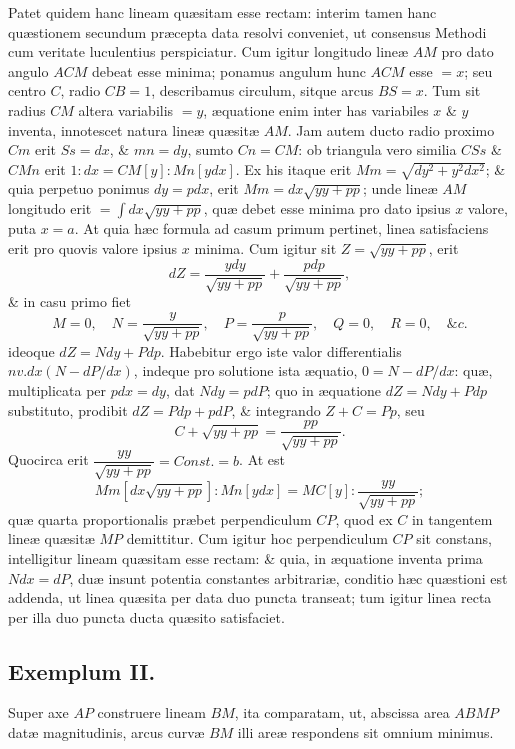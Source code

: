 Patet quidem hanc lineam quæsitam esse rectam: interim tamen hanc quæstionem secundum præcepta data resolvi conveniet, ut consensus Methodi cum veritate luculentius perspiciatur. Cum igitur longitudo lineæ $AM$ pro dato angulo $ACM$ debeat esse minima; ponamus angulum hunc $ACM$ esse $=x$; seu centro $C$, radio $CB=1$, describamus circulum, sitque arcus $BS=x$. Tum sit radius $CM$ altera variabilis $=y$, æquatione enim inter has variabiles $x$ \& $y$ inventa, innotescet natura lineæ quæsitæ $AM$. Jam autem ducto radio proximo $Cm$ erit $Ss=dx$, \& $mn=dy$, sumto $Cn=CM$: ob triangula vero similia $CSs$ \& $CMn$ erit $1:dx=CM[y]:Mn[ydx]$. Ex his itaque erit $Mm=\sqrt{dy^2+y^2dx^2}$; \& quia perpetuo ponimus $dy=pdx$, erit $Mm=dx\sqrt{yy+pp}$; unde lineæ $AM$ longitudo erit $=\int dx\sqrt{yy+pp}$, quæ debet esse minima pro dato ipsius $x$ valore, puta $x=a$. At quia hæc formula ad casum primum pertinet, linea satisfaciens erit pro quovis valore ipsius $x$ minima. Cum igitur sit $Z=\sqrt{yy+pp}$, erit
\[dZ=\frac{ydy}{\sqrt{yy+pp}}+\frac{pdp}{\sqrt{yy+pp}},\]
\& in casu primo fiet
\[M=0,\quad N=\frac{y}{\sqrt{yy+pp}},\quad P=\frac{p}{\sqrt{yy+pp}},\quad Q=0,\quad R=0,\quad\&c.\]
ideoque $dZ=Ndy+Pdp$. Habebitur ergo iste valor differentialis $nv.dx(N-dP/dx)$, indeque pro solutione ista æquatio, $0=N-dP/dx$: quæ, multiplicata per $pdx=dy$, dat $Ndy=pdP$; quo in æquatione $dZ=Ndy+Pdp$ substituto, prodibit $dZ=Pdp+pdP$, \& integrando $Z+C=Pp$, seu
\[C+\sqrt{yy+pp}=\frac{pp}{\sqrt{yy+pp}}.\]
Quocirca erit $\dfrac{yy}{\sqrt{yy+pp}}=\mathit{Const.}=b$. At est
\[Mm[dx\sqrt{yy+pp}]:Mn[ydx]=MC[y]:\frac{yy}{\sqrt{yy+pp}};\]
quæ quarta proportionalis præbet perpendiculum $CP$, quod ex $C$ in tangentem lineæ quæsitæ $MP$ demittitur. Cum igitur hoc perpendiculum $CP$ sit constans, intelligitur lineam quæsitam esse rectam: \& quia, in æquatione inventa prima $Ndx=dP$, duæ insunt potentia constantes arbitrariæ, conditio hæc quæstioni est addenda, ut linea quæsita per data duo puncta transeat; tum igitur linea recta per illa duo puncta ducta quæsito satisfaciet.
\subsection*{Exemplum II.}
Super axe $AP$ construere lineam $BM$, ita comparatam, ut, abscissa area $ABMP$ datæ magnitudinis, arcus curvæ $BM$ illi areæ respondens sit omnium minimus.

